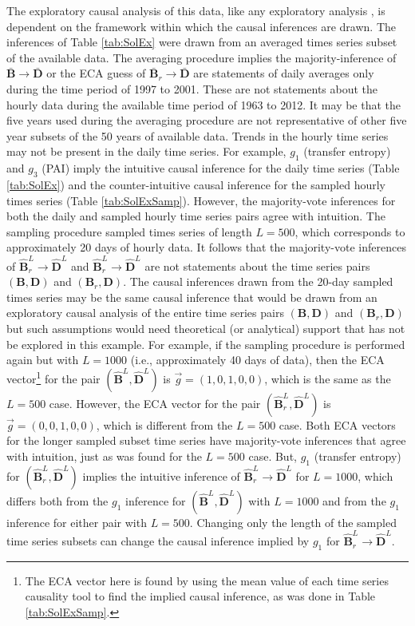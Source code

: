 The exploratory causal analysis of this data, like any exploratory analysis \cite{Tukey1977}, is dependent on the framework within which the causal inferences are drawn.  The inferences of Table \ref{tab:SolEx} were drawn from an averaged times series subset of the available data.  The averaging procedure implies the majority-inference of $\bar{\mathbf{B}}\rightarrow\bar{\mathbf{D}}$ or the ECA guess of $\bar{\mathbf{B}}_r\rightarrow\bar{\mathbf{D}}$ are statements of daily averages only during the time period of 1997 to 2001.  These are not statements about the hourly data during the available time period of 1963 to 2012.  It may be that the five years used during the averaging procedure are not representative of other five year subsets of the 50 years of available data.  Trends in the hourly time series may not be present in the daily time series.  For example, $g_1$ (transfer entropy) and $g_3$ (PAI) imply the intuitive causal inference for the daily time series (Table \ref{tab:SolEx}) and the counter-intuitive causal inference for the sampled hourly times series (Table \ref{tab:SolExSamp}).  However, the majority-vote inferences for both the daily and sampled hourly time series pairs agree with intuition.  The sampling procedure sampled times series of length $L=500$, which corresponds to approximately 20 days of hourly data.  It follows that the majority-vote inferences of $\hat{\mathbf{B}}^L_r\rightarrow\hat{\mathbf{D}}^L$ and $\hat{\mathbf{B}}^L_r\rightarrow\hat{\mathbf{D}}^L$ are not statements about the time series pairs $(\mathbf{B},\mathbf{D})$ and $(\mathbf{B}_r,\mathbf{D})$.  The causal inferences drawn from the 20-day sampled times series may be the same causal inference that would be drawn from an exploratory causal analysis of the entire time series pairs $(\mathbf{B},\mathbf{D})$ and $(\mathbf{B}_r,\mathbf{D})$ but such assumptions would need theoretical (or analytical) support that has not be explored in this example.  For example, if the sampling procedure is performed again but with $L=1000$ (i.e., approximately 40 days of data), then the ECA vector\footnote{The ECA vector here is found by using the mean value of each time series causality tool to find the implied causal inference, as was done in Table \ref{tab:SolExSamp}.} for the pair $(\hat{\mathbf{B}}^L,\hat{\mathbf{D}}^L)$ is $\vec{g}=(1,0,1,0,0)$, which is the same as the $L=500$ case.  However, the ECA vector for the pair $(\hat{\mathbf{B}}^L_r,\hat{\mathbf{D}}^L)$ is $\vec{g}=(0,0,1,0,0)$, which is different from the $L=500$ case.  Both ECA vectors for the longer sampled subset time series have majority-vote inferences that agree with intuition, just as was found for the $L=500$ case.  But, $g_1$ (transfer entropy) for $(\hat{\mathbf{B}}^L_r,\hat{\mathbf{D}}^L)$ implies the intuitive inference of $\hat{\mathbf{B}}^L_r\rightarrow\hat{\mathbf{D}}^L$ for $L=1000$, which differs both from the $g_1$ inference for $(\hat{\mathbf{B}}^L,\hat{\mathbf{D}}^L)$ with $L=1000$ and from the $g_1$ inference for either pair with $L=500$.  Changing only the length of the sampled time series subsets can change the causal inference implied by $g_1$ for $\hat{\mathbf{B}}^L_r\rightarrow\hat{\mathbf{D}}^L$.

